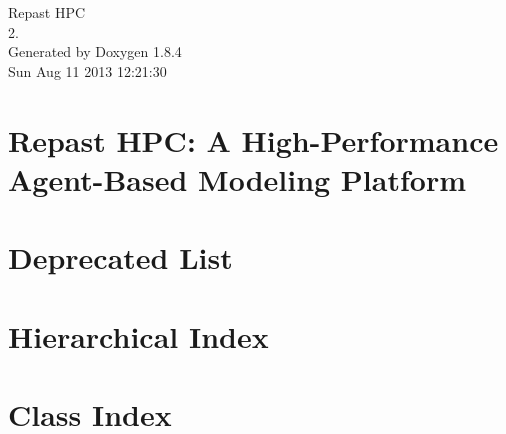 \documentclass[twoside]{book}
\newcommand{\clearemptydoublepage}{%
  \newpage{\pagestyle{empty}\cleardoublepage}%
}
\begin{document}
\hypersetup{pageanchor=false}
\begin{titlepage}
\vspace*{7cm}
\begin{center}%
{\Large Repast H\-P\-C \\[1ex]\large 2. }\\
\vspace*{1cm}
{\large Generated by Doxygen 1.8.4}\\
\vspace*{0.5cm}
{\small Sun Aug 11 2013 12:21:30}\\
\end{center}
\end{titlepage}
\clearemptydoublepage
\tableofcontents
\clearemptydoublepage
{}
\hypersetup{pageanchor=true}

\chapter{Repast H\-P\-C\-: A High-\/\-Performance Agent-\/\-Based Modeling Platform}
\label{index}\hypertarget{index}{}
\chapter{Deprecated List}
\label{deprecated}
\hypertarget{deprecated}{}

\chapter{Hierarchical Index}

\chapter{Class Index}

\end{document}
